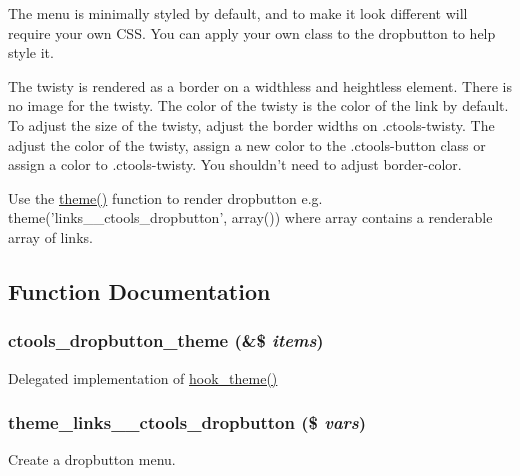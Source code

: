 The menu is minimally styled by default, and to make it look different will require your own CSS. You can apply your own class to the dropbutton to help style it.

The twisty is rendered as a border on a widthless and heightless element. There is no image for the twisty. The color of the twisty is the color of the link by default. To adjust the size of the twisty, adjust the border widths on .ctools-\/twisty. The adjust the color of the twisty, assign a new color to the .ctools-\/button class or assign a color to .ctools-\/twisty. You shouldn't need to adjust border-\/color.

Use the \hyperlink{includes_2theme_8inc_a7c25609a935874541a19657affd30fff}{theme()} function to render dropbutton e.g. theme('links\_\-\_\-ctools\_\-dropbutton', array()) where array contains a renderable array of links. 

\subsection{Function Documentation}
\hypertarget{dropbutton_8theme_8inc_a99047f738264a4430be947b0405f6334}{
\subsubsection[{ctools\_\-dropbutton\_\-theme}]{\setlength{\rightskip}{0pt plus 5cm}ctools\_\-dropbutton\_\-theme (\&\$ {\em items})}}
\label{dropbutton_8theme_8inc_a99047f738264a4430be947b0405f6334}
Delegated implementation of \hyperlink{group__hooks_ga013ccb45c7aaab1c16cf9691428c910d}{hook\_\-theme()} \hypertarget{dropbutton_8theme_8inc_a17b29f655247ef7a2a5925a4963e7a6f}{
\subsubsection[{theme\_\-links\_\-\_\-ctools\_\-dropbutton}]{\setlength{\rightskip}{0pt plus 5cm}theme\_\-links\_\-\_\-ctools\_\-dropbutton (\$ {\em vars})}}
\label{dropbutton_8theme_8inc_a17b29f655247ef7a2a5925a4963e7a6f}
Create a dropbutton menu.


